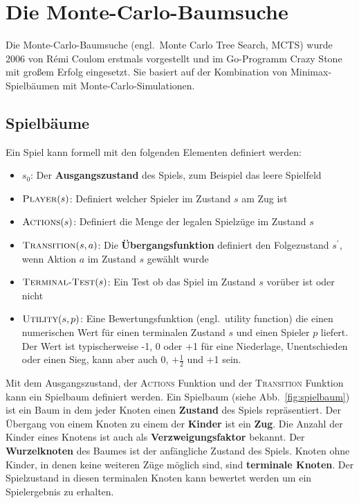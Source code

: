 \section{Die Monte-Carlo-Baumsuche}
\label{chap:mcts-intro}

Die Monte-Carlo-Baumsuche (engl.\ Monte Carlo Tree Search, MCTS) wurde 2006 von R\'{e}mi Coulom erstmals vorgestellt und im Go-Programm Crazy Stone mit großem Erfolg eingesetzt\autocite{coulomEfficientSelectivityBackup2007}.
Sie basiert auf der Kombination von Minimax-Spielbäumen mit Monte-Carlo-Simulationen.


\subsection{Spielbäume}
Ein Spiel kann formell mit den folgenden Elementen definiert werden\autocite[\ppno~162]{russellArtificialIntelligenceModern2009}:
\begin{itemize}
	\item $s_0$: Der \textbf{Ausgangszustand} des Spiels, zum Beispiel das leere Spielfeld
	\item $\textsc{Player}(s)$: Definiert welcher Spieler im Zustand $s$ am Zug ist
	\item $\textsc{Actions}(s)$: Definiert die Menge der legalen Spielzüge im Zustand $s$
	\item $\textsc{Transition}(s,a)$: Die \textbf{Übergangsfunktion} definiert den Folgezustand $s^\prime$, wenn Aktion $a$ im Zustand $s$ gewählt wurde
	\item $\textsc{Terminal-Test}(s)$: Ein Test ob das Spiel im Zustand $s$ vorüber ist oder nicht
	\item $\textsc{Utility}(s,p)$: Eine Bewertungsfunktion (engl.\ utility function) die einen numerischen Wert für einen terminalen Zustand $s$ und einen Spieler $p$ liefert. Der Wert ist typischerweise -1, 0 oder +1 für eine Niederlage, Unentschieden oder einen Sieg, kann aber auch 0, $+\frac{1}{2}$ und +1 sein.
\end{itemize}

Mit dem Ausgangszustand, der \textsc{Actions} Funktion und der \textsc{Transition} Funktion kann ein Spielbaum definiert werden.
Ein Spielbaum (siehe Abb.~\ref{fig:spielbaum}) ist ein Baum in dem jeder Knoten einen \textbf{Zustand} des Spiels repräsentiert.
Der Übergang von einem Knoten zu einem der \textbf{Kinder} ist ein \textbf{Zug}.
Die Anzahl der Kinder eines Knotens ist auch als \textbf{Verzweigungsfaktor} bekannt.
Der \textbf{Wurzelknoten} des Baumes ist der anfängliche Zustand des Spiels.
Knoten ohne Kinder, in denen keine weiteren Züge möglich sind, sind \textbf{terminale Knoten}.
Der Spielzustand in diesen terminalen Knoten kann bewertet werden um ein Spielergebnis zu erhalten.


